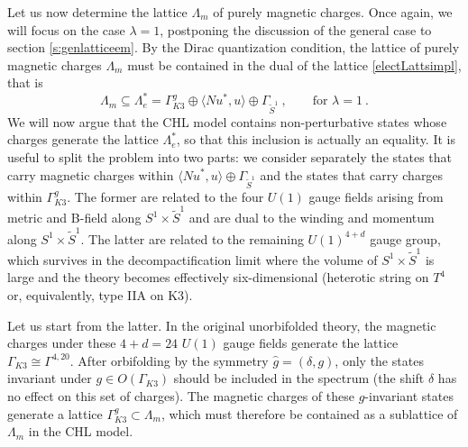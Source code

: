 \documentclass[a4paper,11pt]{article}
\newcommand{\E}{\mathcal{E}}
\numberwithin{equation}{section}
\def\be{\begin{equation}}
\def\ee{\end{equation}}
\begin{document}
Let us now determine the lattice $\Lambda_m$ of purely magnetic charges. Once again, we will focus on the case $\lambda=1$, postponing the discussion of the general case to section \ref{s:genlatticeem}.
By the Dirac quantization condition, the lattice of purely magnetic charges $\Lambda_m$ must be contained in the dual of the lattice \eqref{electLattsimpl}, that is 
%
\be\label{magnincl} \Lambda_m\subseteq \Lambda_e^*=\Gamma_{K3}^g\oplus \langle N u^*, u\rangle \oplus \Gamma_{\tilde S^1}\ ,\qquad \text{for }\lambda=1\ .
\ee We will now argue that the CHL model contains non-perturbative states whose charges generate the lattice $\Lambda_e^*$, so that this inclusion is actually an equality. It is useful to split the problem into two parts: we consider separately the states that carry magnetic charges within $\langle N u^*, u\rangle \oplus \Gamma_{\tilde S^1}$ and the states that carry charges within $\Gamma_{K3}^g$. The former are related to the four $U(1)$ gauge fields arising from metric and B-field along $S^1\times \tilde S^1$ and are dual to the winding and momentum along $S^1\times \tilde S^1$. The latter are related to the remaining $U(1)^{4+d}$ gauge group, which survives in the decompactification limit where the volume of $S^1\times \tilde S^1$ is large and the theory becomes effectively six-dimensional (heterotic string on $T^4$ or, equivalently, type IIA on K3). 

Let us start from the latter. In the original unorbifolded theory, the magnetic charges under these $4+d=24$ $U(1)$ gauge fields generate the lattice $\Gamma_{K3}\cong \Gamma^{4,20}$. After orbifolding by the symmetry $\hat g=(\delta, g)$, only the states invariant under $g\in O(\Gamma_{K3})$ should be included in the spectrum (the shift $\delta$ has no effect on this set of charges). The magnetic charges of these $g$-invariant  states generate a lattice $\Gamma_{K3}^g\subset \Lambda_m$, which must therefore be contained as a sublattice of $\Lambda_m$  in the CHL model. 
\end{document}

